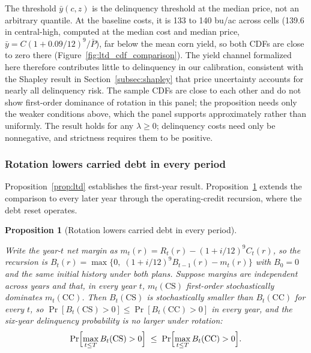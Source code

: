 \documentclass[11pt,letterpaper]{article}
\newtheorem{theorem}{Proposition}
\theoremstyle{remark}
\begin{document}
The threshold $\bar{y}(c,z)$ is the delinquency threshold at the median price, not an arbitrary quantile. At the baseline costs, it is 133 to 140 bu/ac across cells (139.6 in central-high, computed at the median cost and median price, $\bar{y} = C(1+0.09/12)^{9}/\bar{P}$), far below the mean corn yield, so both CDFs are close to zero there (Figure~\ref{fig:ltd_cdf_comparison}). The yield channel formalized here therefore contributes little to delinquency in our calibration, consistent with the Shapley result in Section~\ref{subsec:shapley} that price uncertainty accounts for nearly all delinquency risk. The sample CDFs are close to each other and do not show first-order dominance of rotation in this panel; the proposition needs only the weaker conditions above, which the panel supports approximately rather than uniformly. The result holds for any $\lambda \geq 0$; delinquency costs need only be nonnegative, and strictness requires them to be positive.
 
\subsubsection{\label{subsubsec:proposition_2}Rotation lowers carried debt in every period}
 
Proposition~\ref{prop:ltd} establishes the first-year result. Proposition~\ref{prop:credit_path} extends the comparison to every later year through the operating-credit recursion, where the debt reset operates.

\begin{theorem}[Rotation lowers carried debt in every period]
\label{prop:credit_path}

Write the year-$t$ net margin as $m_t(r) = R_t(r) - (1+i/12)^{9}C_t(r)$, so the recursion is $B_t(r) = \max\{0,\; (1+i/12)^{9}B_{t-1}(r) - m_t(r)\}$ with $B_0 = 0$ and the same initial history under both plans. Suppose margins are independent across years and that, in every year $t$, $m_t(\text{CS})$ first-order stochastically dominates $m_t(\text{CC})$. Then $B_t(\text{CS})$ is stochastically smaller than $B_t(\text{CC})$ for every $t$, so $\Pr[B_t(\text{CS}) > 0] \leq \Pr[B_t(\text{CC}) > 0]$ in every year, and the six-year delinquency probability is no larger under rotation:
\begin{equation}
\Pr\Bigl[\max_{t \leq T} B_t(\text{CS}) > 0\Bigr]\;\leq\;\Pr\Bigl[\max_{t \leq T} B_t(\text{CC}) > 0\Bigr].
\end{equation}
\end{theorem}
 
\end{document}
